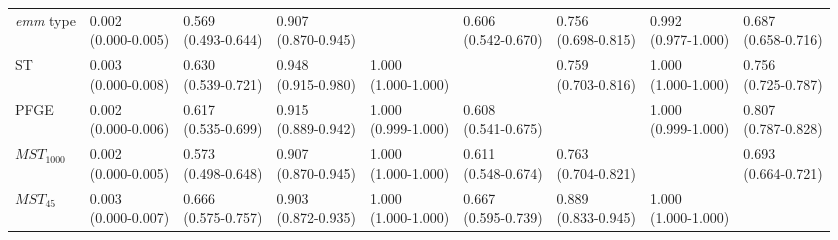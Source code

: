 \begin{table}[!ht]
{\begin{threeparttable}[b]
\begin{tabular}{@{}lllllllll@{}}
        \textit{emm} type & \Centerstack{0.002 \\ (0.000-0.005)} & \Centerstack{0.569 \\ (0.493-0.644)} & \Centerstack{0.907 \\ (0.870-0.945)} & & \Centerstack{0.606 \\ (0.542-0.670)} & \Centerstack{0.756 \\ (0.698-0.815)} & \Centerstack{0.992 \\ (0.977-1.000)} & \Centerstack{0.687 \\ (0.658-0.716)} \\
        ST & \Centerstack{0.003 \\ (0.000-0.008)} & \Centerstack{0.630 \\ (0.539-0.721)} & \Centerstack{0.948 \\ (0.915-0.980)} & \Centerstack{1.000 \\ (1.000-1.000)} & & \Centerstack{0.759 \\ (0.703-0.816)} & \Centerstack{1.000 \\ (1.000-1.000)} & \Centerstack{0.756 \\ (0.725-0.787)} \\
        PFGE & \Centerstack{0.002 \\ (0.000-0.006)} & \Centerstack{0.617 \\ (0.535-0.699)} & \Centerstack{0.915 \\ (0.889-0.942)} & \Centerstack{1.000 \\ (0.999-1.000)} & \Centerstack{0.608 \\ (0.541-0.675)} & & \Centerstack{1.000 \\ (0.999-1.000)} & \Centerstack{0.807 \\ (0.787-0.828)} \\
        $MST_{1000}$ & \Centerstack{0.002 \\ (0.000-0.005)} & \Centerstack{0.573 \\ (0.498-0.648}) & \Centerstack{0.907 \\ (0.870-0.945)} & \Centerstack{1.000 \\ (1.000-1.000)} & \Centerstack{0.611 \\ (0.548-0.674)} & \Centerstack{0.763 \\ (0.704-0.821)} & & \Centerstack{0.693 \\ (0.664-0.721)} \\
        $MST_{45}$ & \Centerstack{0.003 \\ (0.000-0.007)} & \Centerstack{0.666 \\ (0.575-0.757)} & \Centerstack{0.903 \\ (0.872-0.935)} & \Centerstack{1.000 \\ (1.000-1.000)} & \Centerstack{0.667 \\ (0.595-0.739)} & \Centerstack{0.889 \\ (0.833-0.945)} & \Centerstack{1.000 \\ (1.000-1.000)} & \\

\end{tabular}
\end{threeparttable}}
\end{table}
